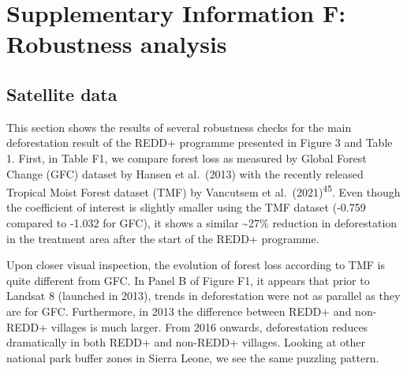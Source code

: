 \documentclass[
]{article}
\begin{document}
\setcounter{table}{0}  
\renewcommand{\thetable}{F\arabic{table}}
\setcounter{figure}{0} 
\renewcommand{\thefigure}{F\arabic{figure}}
\clearpage

\hypertarget{supplementary-information-f-robustness-analysis}{%
\section*{Supplementary Information F: Robustness
analysis}\label{supplementary-information-f-robustness-analysis}}

\hypertarget{satellite-data-1}{%
\subsection{Satellite data}\label{satellite-data-1}}

This section shows the results of several robustness checks for the main
deforestation result of the REDD+ programme presented in Figure 3 and
Table 1. First, in Table F1, we compare forest loss as measured by
Global Forest Change (GFC) dataset by Hansen et al.~(2013) with the
recently released Tropical Moist Forest dataset (TMF) by Vancutsem et
al.~(2021)\textsuperscript{45}. Even though the coefficient of interest
is slightly smaller using the TMF dataset (-0.759 compared to -1.032 for
GFC), it shows a similar \textasciitilde27\% reduction in deforestation
in the treatment area after the start of the REDD+ programme.

Upon closer visual inspection, the evolution of forest loss according to
TMF is quite different from GFC. In Panel B of Figure F1, it appears
that prior to Landsat 8 (launched in 2013), trends in deforestation were
not as parallel as they are for GFC. Furthermore, in 2013 the difference
between REDD+ and non-REDD+ villages is much larger. From 2016 onwards,
deforestation reduces dramatically in both REDD+ and non-REDD+ villages.
Looking at other national park buffer zones in Sierra Leone, we see the
same puzzling pattern.
\end{document}
